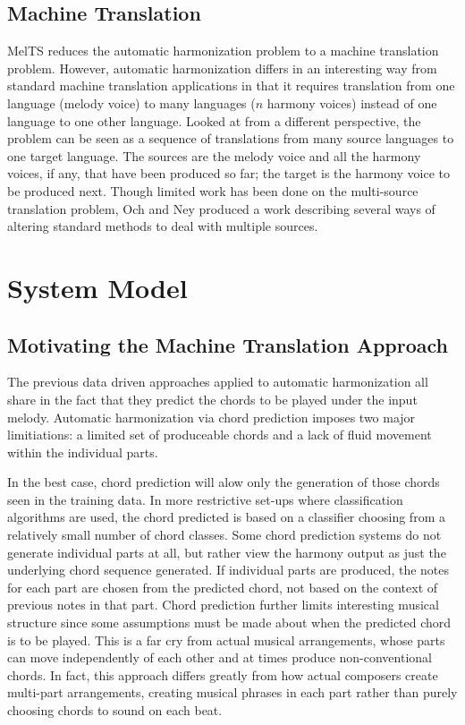 \documentclass{sig-alternate}
\begin{document}
\subsection{Machine Translation}
MelTS reduces the automatic harmonization problem to a machine translation problem. However, automatic harmonization differs in an interesting way from standard machine translation applications in that it requires translation from one language (melody voice) to many languages ($n$ harmony voices) instead of one language to one other language. Looked at from a different perspective, the problem can be seen as a sequence of translations from many source languages to one target language. The sources are the melody voice and all the harmony voices, if any, that have been produced so far; the target is the harmony voice to be produced next. Though limited work has been done on the multi-source translation problem, Och and Ney \cite{franzjosefochhermannney2001} produced a work describing several ways of altering standard methods to deal with multiple sources.

\section{System Model}
\label{sec:sys_model}
\subsection{Motivating the Machine Translation Approach}

The previous data driven approaches applied to automatic harmonization all share in the fact that they predict the chords to be played under the input melody. Automatic harmonization via chord prediction imposes two major limitiations: a limited set of produceable chords and a lack of fluid movement within the individual parts. 

In the best case, chord prediction will alow only the generation of those chords seen in the training data. In more restrictive set-ups where classification algorithms are used, the chord predicted is based on a classifier choosing from a relatively small number of chord classes. Some chord prediction systems do not generate individual parts at all, but rather view the harmony output as just the underlying chord sequence generated. If individual parts are produced, the notes for each part are chosen from the predicted chord, not based on the context of previous notes in that part. Chord prediction further limits interesting musical structure since some assumptions must be made about when the predicted chord is to be played. This is a far cry from actual musical arrangements, whose parts can move independently of each other and at times produce non-conventional chords. In fact, this approach differs greatly from how actual composers create multi-part arrangements, creating musical phrases in each part rather than purely choosing chords to sound on each beat.
\end{document}
